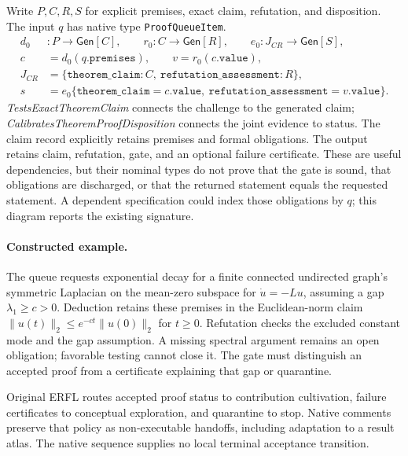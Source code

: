 Write $P,C,R,S$ for explicit premises, exact claim, refutation, and disposition.
The input $q$ has native type \texttt{ProofQueueItem}.
\[
\begin{aligned}
 d_0 &:P\to\mathsf{Gen}[C],\qquad
 r_0:C\to\mathsf{Gen}[R],\qquad e_0:J_{CR}\to\mathsf{Gen}[S],\\
 c&=d_0(q.\mathtt{premises}),\qquad v=r_0(c.\mathtt{value}),\\
 J_{CR}&=\{\mathtt{theorem\_claim}:C,
           \ \mathtt{refutation\_assessment}:R\},\\
 s&=e_0\{\mathtt{theorem\_claim}=c.\mathtt{value},\
         \mathtt{refutation\_assessment}=v.\mathtt{value}\}.
\end{aligned}
\]
\emph{Tests\allowbreak Exact\allowbreak Theorem\allowbreak Claim} connects the challenge to the generated claim;
\emph{Calibrates\allowbreak Theorem\allowbreak Proof\allowbreak Disposition} connects the joint evidence to status.
The claim record explicitly retains premises and formal obligations. The output
retains claim, refutation, gate, and an optional failure certificate. These are
useful dependencies, but their nominal types do not prove that the gate is sound,
that obligations are discharged, or that the returned statement equals the
requested statement. A dependent specification could index those obligations by
$q$; this diagram reports the existing signature.

\paragraph{Constructed example.}
The queue requests exponential decay for a finite connected undirected graph's symmetric Laplacian on
the mean-zero subspace for $\dot u=-Lu$, assuming a gap
$\lambda_1\geq c>0$. Deduction retains these premises in the Euclidean-norm
claim $\|u(t)\|_2\leq e^{-ct}\|u(0)\|_2$ for $t\geq0$.
Refutation checks the excluded constant mode and the gap assumption. A missing
spectral argument remains an open obligation; favorable testing cannot close it.
The gate must distinguish an accepted proof from a certificate explaining that
gap or quarantine.

Original ERFL routes accepted proof status to contribution cultivation, failure
certificates to conceptual exploration, and quarantine to stop. Native comments
preserve that policy as non-executable handoffs, including adaptation to a result
atlas. The native sequence supplies no local terminal acceptance transition.


